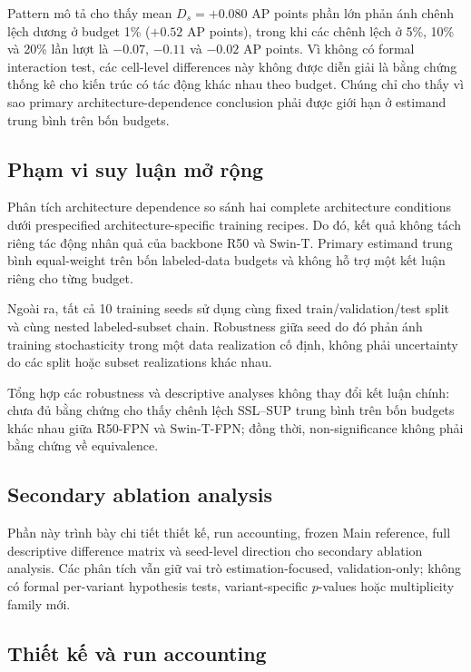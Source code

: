\documentclass[pdflatex,sn-mathphys-num]{sn-jnl}%
\theoremstyle{thmstyleone}%
\theoremstyle{thmstyletwo}%
\theoremstyle{thmstylethree}%
\begin{document}
Pattern mô tả cho thấy mean $D_s=+0.080$ AP points phần lớn phản ánh chênh lệch dương ở budget 1\% ($+0.52$ AP points), trong khi các chênh lệch ở 5\%, 10\% và 20\% lần lượt là $-0.07$, $-0.11$ và $-0.02$ AP points. Vì không có formal interaction test, các cell-level differences này không được diễn giải là bằng chứng thống kê cho kiến trúc có tác động khác nhau theo budget. Chúng chỉ cho thấy vì sao primary architecture-dependence conclusion phải được giới hạn ở estimand trung bình trên bốn budgets.

\subsection{Phạm vi suy luận mở rộng}

Phân tích architecture dependence so sánh hai complete architecture conditions dưới prespecified architecture-specific training recipes. Do đó, kết quả không tách riêng tác động nhân quả của backbone R50 và Swin-T. Primary estimand trung bình equal-weight trên bốn labeled-data budgets và không hỗ trợ một kết luận riêng cho từng budget.

Ngoài ra, tất cả 10 training seeds sử dụng cùng fixed train/validation/test split và cùng nested labeled-subset chain. Robustness giữa seed do đó phản ánh training stochasticity trong một data realization cố định, không phải uncertainty do các split hoặc subset realizations khác nhau.

Tổng hợp các robustness và descriptive analyses không thay đổi kết luận chính: chưa đủ bằng chứng cho thấy chênh lệch SSL--SUP trung bình trên bốn budgets khác nhau giữa R50-FPN và Swin-T-FPN; đồng thời, non-significance không phải bằng chứng về equivalence.


\subsection{Secondary ablation analysis}
\label{sec:supp_ablation}

Phần này trình bày chi tiết thiết kế, run accounting, frozen Main reference, full descriptive difference matrix và seed-level direction cho secondary ablation analysis. Các phân tích vẫn giữ vai trò estimation-focused, validation-only; không có formal per-variant hypothesis tests, variant-specific $p$-values hoặc multiplicity family mới.

\subsection{Thiết kế và run accounting}
\end{document}
